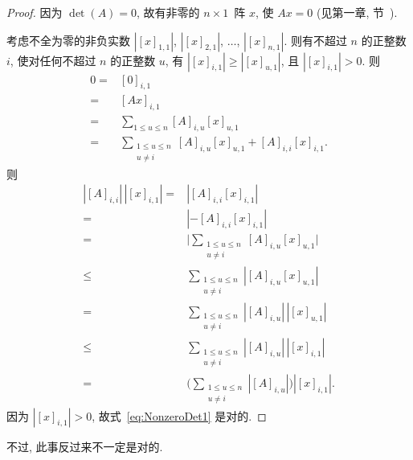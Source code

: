\begin{proof}
    因为 \(\det {(A)} = 0\),
    故有非零的 \(n \times 1\)~阵 \(x\),
    使 \(Ax = 0\)
    (见第一章, 节~).

    考虑不全为零的非负实数
    \(|[x]_{1,1}|\), \(|[x]_{2,1}|\), \(\dots\), \(|[x]_{n,1}|\).
    则有不超过 \(n\) 的正整数 \(i\),
    使对任何不超过 \(n\) 的正整数 \(u\),
    有 \(|[x]_{i,1}| \geq |[x]_{u,1}|\),
    且 \(|[x]_{i,1}| > 0\).
    则
    \begin{align*}
        0
        = {} &
        [0]_{i,1}
        \\
        = {} &
        [A x]_{i,1}
        \\
        = {} &
        \sum_{1 \leq u \leq n}
        {[A]_{i,u} [x]_{u,1}}
        \\
        = {} &
        \sum_{\substack{1 \leq u \leq n \\ u \neq i}}
        {[A]_{i,u} [x]_{u,1}}
        + [A]_{i,i} [x]_{i,1}.
    \end{align*}
    则
    \begin{align*}
        |[A]_{i,i}|\,|[x]_{i,1}|
        = {}    &
        |{[A]_{i,i} [x]_{i,1}}|
        \\
        = {}    &
        |{-[A]_{i,i} [x]_{i,1}}|
        \\
        = {}    &
        \Bigg|
        \sum_{\substack{1 \leq u \leq n \\ u \neq i}}
        {[A]_{i,u} [x]_{u,1}}
        \Bigg|
        \\
        \leq {} &
        \sum_{\substack{1 \leq u \leq n \\ u \neq i}}
        {|{[A]_{i,u} [x]_{u,1}}|}
        \\
        = {}    &
        \sum_{\substack{1 \leq u \leq n \\ u \neq i}}
        {|[A]_{i,u}|\, |[x]_{u,1}|}
        \\
        \leq {} &
        \sum_{\substack{1 \leq u \leq n \\ u \neq i}}
        {|[A]_{i,u}|\, |[x]_{i,1}|}
        \\
        = {}    &
        \Bigg(
        \sum_{\substack{1 \leq u \leq n \\ u \neq i}}
        {|[A]_{i,u}|}
        \Bigg) |[x]_{i,1}|.
    \end{align*}
    因为 \(|[x]_{i,1}| > 0\),
    故式~\eqref{eq:NonzeroDet1} 是对的.
\end{proof}

不过, 此事反过来不一定是对的.


